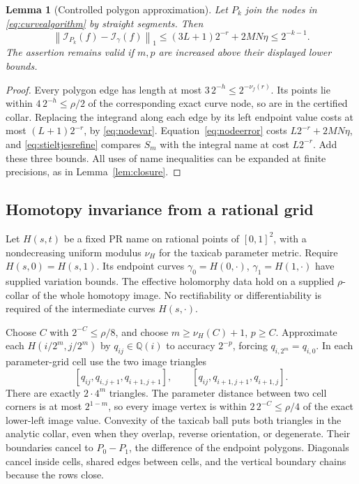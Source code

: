 \documentclass[11pt]{article}
\newtheorem{lemma}[theorem]{Lemma}
\theoremstyle{definition}
\newcommand{\Q}{\mathbb Q}
\newcommand{\norm}[1]{\left\lVert#1\right\rVert_1}
\newcommand{\Int}{\mathcal I}
\begin{document}
\begin{lemma}[Controlled polygon approximation]\label{lem:polygonapprox}
Let \(P_k\) join the nodes in \eqref{eq:curvealgorithm} by straight
segments. Then
\begin{equation}\label{eq:polygonerror}
 \norm{\Int_{P_k}(f)-\Int_\gamma(f)}
 \le(3L+1)2^{-r}+2MN\eta\le2^{-k-1}.
\end{equation}
The assertion remains valid if \(m,p\) are increased above their
displayed lower bounds.
\end{lemma}
\begin{proof}
Every polygon edge has length at most \(3\,2^{-h}\le2^{-\nu_f(r)}\).
Its points lie within \(4\,2^{-h}\le\rho/2\) of the corresponding exact
curve node, so are in the certified collar. Replacing the integrand along
each edge by its left endpoint value costs at most
\((L+1)2^{-r}\), by \eqref{eq:nodevar}. Equation~\eqref{eq:nodeerror}
costs \(L2^{-r}+2MN\eta\), and \eqref{eq:stieltjesrefine} compares
\(S_m\) with the integral name at cost \(L2^{-r}\). Add these three
bounds. All uses of name inequalities can be expanded at finite
precisions, as in Lemma~\ref{lem:closure}.
\end{proof}

\subsection{Homotopy invariance from a rational grid}

Let \(H(s,t)\) be a fixed PR name on rational points of \([0,1]^2\),
with a nondecreasing uniform modulus \(\nu_H\) for the taxicab parameter
metric. Require \(H(s,0)=H(s,1)\). Its endpoint curves
\(\gamma_0=H(0,\cdot)\), \(\gamma_1=H(1,\cdot)\) have supplied variation
bounds. The effective holomorphy data hold on a supplied
\(\rho\)-collar of the whole homotopy image.
No rectifiability or differentiability is required of the intermediate
curves \(H(s,\cdot)\).

Choose \(C\) with \(2^{-C}\le\rho/8\), and choose
\(m\ge\nu_H(C)+1\), \(p\ge C\). Approximate each
\(H(i/2^m,j/2^m)\) by \(q_{ij}\in\Q(i)\) to accuracy \(2^{-p}\),
forcing \(q_{i,2^m}=q_{i,0}\). In each parameter-grid cell use the two
image triangles
\[
 [q_{ij},q_{i,j+1},q_{i+1,j+1}],\qquad
 [q_{ij},q_{i+1,j+1},q_{i+1,j}].
\]
There are exactly \(2\cdot4^m\) triangles. The parameter distance
between two cell corners is at most \(2^{1-m}\), so every image vertex
is within \(2\,2^{-C}\le\rho/4\) of the exact lower-left image value.
Convexity of the taxicab ball puts both triangles in the analytic
collar, even when they overlap, reverse orientation, or degenerate.
Their boundaries cancel to \(P_0-P_1\), the difference of the endpoint
polygons. Diagonals cancel inside cells, shared edges between cells,
and the vertical boundary chains because the rows close.
\end{document}
